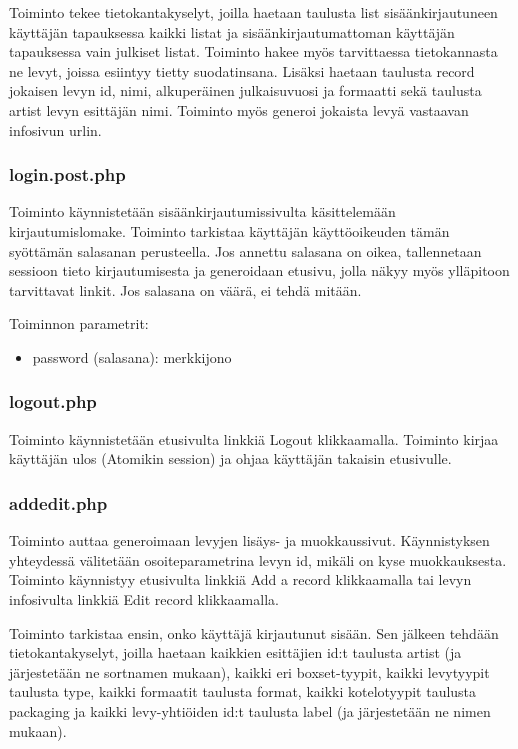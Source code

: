\documentclass[a4paper,12pt]{report}
\begin{document}
Toiminto tekee tietokantakyselyt, joilla haetaan taulusta list
sisäänkirjautuneen käyttäjän tapauksessa kaikki listat ja
sisäänkirjautumattoman käyttäjän tapauksessa vain julkiset listat.  Toiminto
hakee myös tarvittaessa tietokannasta ne levyt, joissa esiintyy tietty
suodatinsana.  Lisäksi haetaan taulusta record jokaisen levyn id, nimi,
alkuperäinen julkaisuvuosi ja formaatti sekä taulusta artist levyn esittäjän
nimi. Toiminto myös generoi jokaista levyä vastaavan infosivun urlin.

\subsubsection{login.post.php}

Toiminto käynnistetään sisäänkirjautumissivulta käsittelemään
kirjautumislomake. Toiminto tarkistaa käyttäjän käyttöoikeuden tämän
syöttämän salasanan perusteella.  Jos annettu salasana on oikea,
tallennetaan sessioon tieto kirjautumisesta ja generoidaan etusivu, jolla
näkyy myös ylläpitoon tarvittavat linkit. Jos salasana on väärä, ei tehdä
mitään.

Toiminnon parametrit:
\begin{itemize}
  \item password (salasana): merkkijono
\end{itemize}

\subsubsection{logout.php}

Toiminto käynnistetään etusivulta linkkiä Logout klikkaamalla. Toiminto
kirjaa käyttäjän ulos (Atomikin session) ja ohjaa käyttäjän takaisin
etusivulle.

\subsubsection{addedit.php}

Toiminto auttaa generoimaan levyjen lisäys- ja muokkaussivut. Käynnistyksen
yhteydessä välitetään osoiteparametrina levyn id, mikäli on kyse muokkauksesta.
Toiminto käynnistyy etusivulta linkkiä Add a record klikkaamalla tai levyn
infosivulta linkkiä Edit record klikkaamalla.

Toiminto tarkistaa ensin, onko käyttäjä kirjautunut sisään.  Sen jälkeen
tehdään tietokantakyselyt, joilla haetaan kaikkien esittäjien id:t taulusta
artist (ja järjestetään ne sortnamen mukaan), kaikki eri boxset-tyypit,
kaikki levytyypit taulusta type, kaikki formaatit taulusta format, kaikki
kotelotyypit taulusta packaging ja kaikki levy-yhtiöiden id:t taulusta label
(ja järjestetään ne nimen mukaan).
\end{document}

